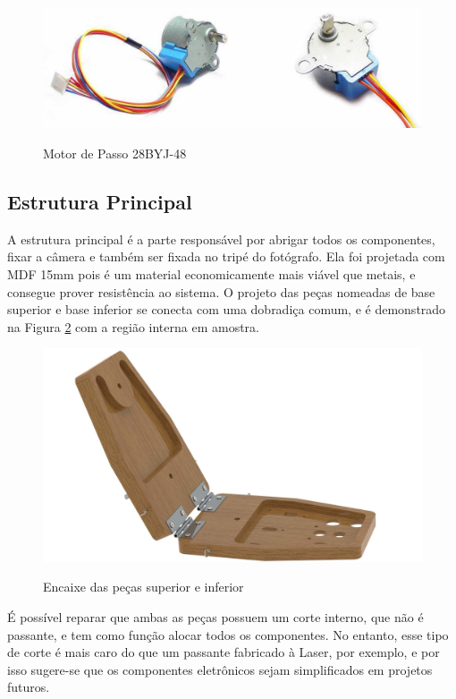 \begin{figure}[!htb]
	\centering
	\caption{Motor de Passo 28BYJ-48}
	\includegraphics[width=0.7\linewidth]{figuras/desPlataforma/motordepasso}
	\label{fig:28byj}
\end{figure}


\subsection{Estrutura Principal}

A estrutura principal é a parte responsável por abrigar todos os componentes, fixar a câmera e também ser fixada no tripé do fotógrafo. Ela foi projetada com MDF 15mm pois é um material economicamente mais viável que metais, e consegue prover resistência ao sistema. O projeto das peças nomeadas de base superior e base inferior se conecta com uma dobradiça comum, e é demonstrado na Figura \ref{fig:renderMontagem} com a região interna em amostra.

\begin{figure}[!htb]
	\centering
	\caption{Encaixe das peças superior e inferior}
	\includegraphics[width=.8\linewidth]{figuras/desPlataforma/renderMontagem}
	\label{fig:renderMontagem}
\end{figure}

É possível reparar que ambas as peças possuem um corte interno, que não é passante, e tem como função alocar todos os componentes. No entanto, esse tipo de corte é mais caro do que um passante fabricado à Laser, por exemplo, e por isso sugere-se que os componentes eletrônicos sejam simplificados em projetos futuros.

